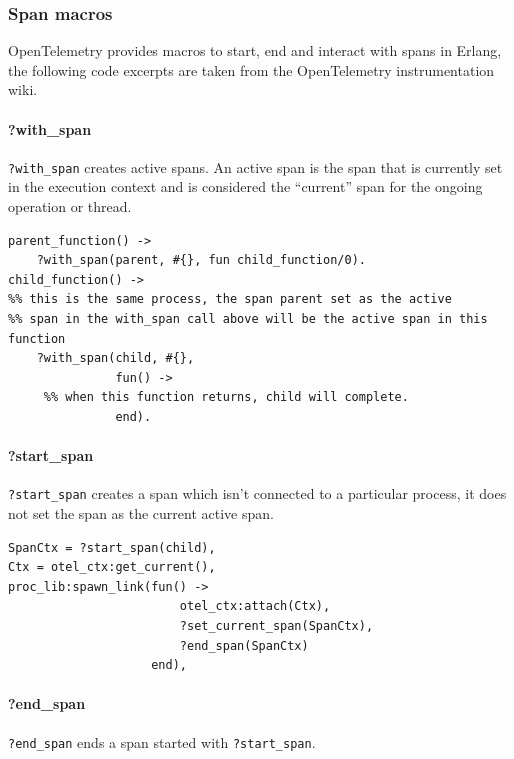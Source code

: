    \subsubsection{Span macros}
        OpenTelemetry provides macros to start, end and interact with spans in Erlang, the following code excerpts are taken from the OpenTelemetry instrumentation wiki. \cite{otel-in}
        \paragraph{?with\_span}
            \texttt{?with\_span} creates active spans. An active span is the span that is currently set in the execution context and is considered the ``current'' span for the ongoing operation or thread. \cite{active-s}
        \begin{verbatim}
parent_function() ->
    ?with_span(parent, #{}, fun child_function/0).
child_function() ->
%% this is the same process, the span parent set as the active
%% span in the with_span call above will be the active span in this function
    ?with_span(child, #{},
               fun() ->
     %% when this function returns, child will complete.
               end).
        \end{verbatim}
        \paragraph{?start\_span}
            \texttt{?start\_span} creates a span which isn't connected to a particular process, it does not set the span as the current active span.
        \begin{verbatim}
SpanCtx = ?start_span(child),
Ctx = otel_ctx:get_current(),
proc_lib:spawn_link(fun() ->
                        otel_ctx:attach(Ctx),
                        ?set_current_span(SpanCtx),
                        ?end_span(SpanCtx)
                    end),
        \end{verbatim}
        \paragraph{?end\_span}
            \texttt{?end\_span} ends a span started with \texttt{?start\_span}.


